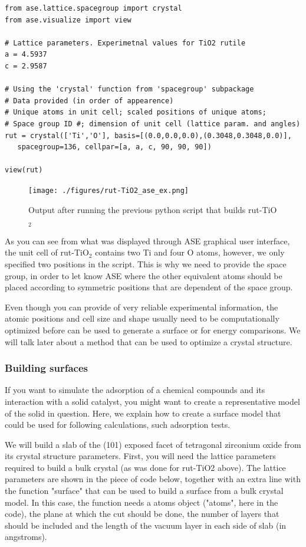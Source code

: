 \documentclass[11pt]{article}
\begin{document}
\begin{verbatim}
from ase.lattice.spacegroup import crystal
from ase.visualize import view

# Lattice parameters. Experimetnal values for TiO2 rutile
a = 4.5937
c = 2.9587

# Using the 'crystal' function from 'spacegroup' subpackage
# Data provided (in order of appearence)
# Unique atoms in unit cell; scaled positions of unique atoms;
# Space group ID #; dimension of unit cell (lattice param. and angles)
rut = crystal(['Ti','O'], basis=[(0.0,0.0,0.0),(0.3048,0.3048,0.0)],
   spacegroup=136, cellpar=[a, a, c, 90, 90, 90])

view(rut)
\end{verbatim}

\begin{figure}[htb]
\centering
\texttt{[image: ./figures/rut-TiO2\_ase\_ex.png]}
\caption{Output after running the previous python script that builds rut-TiO$_{\text{2}}$}
\end{figure}

As you can see from what was displayed through ASE graphical user interface, the unit cell of rut-TiO$_{\text{2}}$ contains two Ti and four O atoms, however, we only specified two positions in the script. This is why we need to provide the space group, in order to let know ASE where the other equivalent atoms should be placed according to symmetric positions that are dependent of the space group.

Even though you can provide of very reliable experimental information, the atomic positions and cell size and shape usually need to be computationally optimized before can be used to generate a surface or for energy comparisons. We will talk later about a method that can be used to optimize a crystal structure.  

\subsubsection{Building surfaces}
\label{sec-2-3-5}
If you want to simulate the adsorption of a chemical compounds and its interaction with a solid catalyst, you might want to create a representative model of the solid in question. Here, we explain how to create a surface model that could be used for following calculations, such adsorption tests. 

We will build a slab of the (101) exposed facet of tetragonal zirconium oxide from its crystal structure parameters. First, you will need the lattice parameters required to build a bulk crystal (as was done for rut-TiO2 above). The lattice parameters are shown in the piece of code below, together with an extra line with the function "surface" that can be used to build a surface from a bulk crystal model. In this case, the function needs a atoms object ("atoms", here in the code), the plane at which the cut should be done, the number of layers that should be included and the length of the vacuum layer in each side of slab (in angstroms). 
\end{document}
